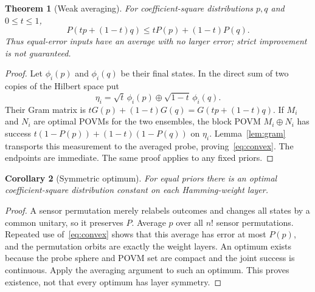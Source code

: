 \documentclass[11pt]{article}
\newtheorem{theorem}{Theorem}
\newtheorem{corollary}[theorem]{Corollary}
\begin{document}
\begin{theorem}[Weak averaging]\label{thm:convex}
For coefficient-square distributions $p,q$ and $0\leq t\leq1$,
\begin{equation}\label{eq:convex}
 P(tp+(1-t)q)\leq tP(p)+(1-t)P(q).
\end{equation}
Thus equal-error inputs have an average with no larger error; strict
improvement is not guaranteed.
\end{theorem}
\begin{proof}
Let $\phi_i(p)$ and $\phi_i(q)$ be their final states. In the direct sum
of two copies of the Hilbert space put
\[
 \eta_i=\sqrt t\,\phi_i(p)\oplus\sqrt{1-t}\,\phi_i(q).
\]
Their Gram matrix is $tG(p)+(1-t)G(q)=G(tp+(1-t)q)$.
If $M_i$ and $N_i$ are optimal POVMs for the two ensembles, the block
POVM $M_i\oplus N_i$ has success $t(1-P(p))+(1-t)(1-P(q))$
on $\eta_i$. Lemma~\ref{lem:gram} transports this measurement to
the averaged probe, proving~\eqref{eq:convex}. The endpoints are immediate.
The same proof applies to any fixed priors.
\end{proof}

\begin{corollary}[Symmetric optimum]\label{cor:sym}
For equal priors there is an optimal coefficient-square distribution
constant on each Hamming-weight layer.
\end{corollary}
\begin{proof}
A sensor permutation merely relabels outcomes and changes all states by a
common unitary, so it preserves $P$. Average $p$ over all $n!$ sensor
permutations. Repeated use of~\eqref{eq:convex} shows that this average
has error at most $P(p)$, and the permutation orbits are exactly the
weight layers. An optimum exists because the probe sphere and POVM set
are compact and the joint success is continuous. Apply the averaging
argument to such an optimum. This proves existence, not that every
optimum has layer symmetry.
\end{proof}
\end{document}
